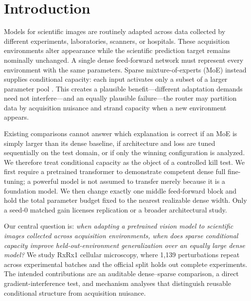 \section{Introduction}

Models for scientific images are routinely adapted across data collected by different experiments,
laboratories, scanners, or hospitals. These acquisition environments alter appearance while the
scientific prediction target remains nominally unchanged. A single dense feed-forward network must
represent every environment with the same parameters. Sparse mixture-of-experts (MoE) instead
supplies conditional capacity: each input activates only a subset of a larger parameter pool
\citep{fedus2022switch}. This
creates a plausible benefit---different adaptation demands need not interfere---and an equally
plausible failure---the router may partition data by acquisition nuisance and strand capacity when
a new environment appears.

Existing comparisons cannot answer which explanation is correct if an MoE is simply larger than
its dense baseline, if architecture and loss are tuned sequentially on the test domain, or if only
the winning configuration is analyzed. We therefore treat conditional capacity as the object of a
controlled kill test. We first require a pretrained transformer to demonstrate competent dense
full fine-tuning; a powerful model is not assumed to transfer merely because it is a foundation
model. We then change exactly one middle feed-forward block and hold the total parameter budget
fixed to the nearest realizable dense width. Only a seed-0 matched gain licenses replication or a
broader architectural study.

Our central question is: \emph{when adapting a pretrained vision model to scientific images
collected across acquisition environments, when does sparse conditional capacity improve
held-out-environment generalization over an equally large dense model?} We study RxRx1 cellular
microscopy, where 1,139 perturbations repeat across experimental batches and the official split
holds out complete experiments. The intended contributions are an auditable dense--sparse
comparison, a direct gradient-interference test, and mechanism analyses that distinguish reusable
conditional structure from acquisition nuisance.

